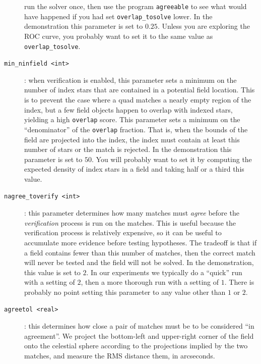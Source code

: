 \documentclass[12pt,letterpaper,titlepage]{article}
\newcommand{\code}[1]{\texttt{#1}}
\begin{document}
\begin{description}
  run the solver once, then use the program \code{agreeable} to see what
  would have happened if you had set \code{overlap\_tosolve} lower.
  In the demonstration this parameter is set to $0.25$.  Unless you are
  exploring the ROC curve, you probably want to set it to the same value as
  \code{overlap\_tosolve}.
\item[\code{min\_ninfield <int>}]: when verification is enabled, this parameter
  sets a minimum on the number of index stars that are contained in a
  potential field location.  This is to prevent the case where a quad matches
  a nearly empty region of the index, but a few field objects happen to overlap
  with indexed stars, yielding a high \code{overlap} score.  This parameter sets
  a minimum on the ``denominator'' of the \code{overlap} fraction.  That is,
  when the bounds of the field are projected into the index, the index must
  contain at least this number of stars or the match is rejected.  In the
  demonstration this parameter is set to $50$.  You will probably want to set
  it by computing the expected density of index stars in a field and taking
  half or a third this value.
\item[\code{nagree\_toverify <int>}]: this parameter determines how many
  matches must \emph{agree} before the \emph{verification} process is run on
  the matches.  This is useful because the verification process is relatively
  expensive, so it can be useful to accumulate more evidence before testing
  hypotheses.  The tradeoff is that if a field contains fewer than this number
  of matches, then the correct match will never be tested and the field will
  not be solved.  In the demonstration, this value is set to $2$.  In our
  experiments we typically do a ``quick'' run with a setting of $2$, then a
  more thorough run with a setting of $1$.  There is probably no point setting
  this parameter to any value other than $1$ or $2$.
\item[\code{agreetol <real>}]: this determines how close a pair of matches
  must be to be considered ``in agreement''.
  We project the bottom-left and upper-right corner of the field 
  onto the celestial sphere according
  to the projections implied by the two matches,
  and measure the RMS distance them, in arcseconds.
\end{description}
\end{document}
